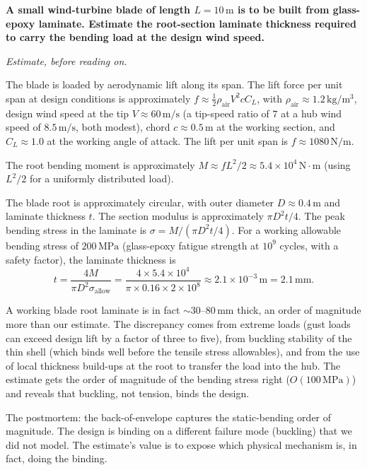 \begin{estimation}
\textbf{A small wind-turbine blade of length $L = 10\,\text{m}$ is to
be built from glass-epoxy laminate. Estimate the root-section laminate
thickness required to carry the bending load at the design wind
speed.}

\smallskip
\textit{Estimate, before reading on.}

\smallskip
The blade is loaded by aerodynamic lift along its span. The lift force
per unit span at design conditions is approximately
$f \approx \tfrac{1}{2} \rho_{\text{air}} V^2 c C_L$, with $\rho_{\text{air}}
\approx 1.2\,\text{kg}/\text{m}^3$, design wind speed at the tip
$V \approx 60\,\text{m}/\text{s}$ (a tip-speed ratio of $7$ at a hub
wind speed of $8.5\,\text{m}/\text{s}$, both modest), chord $c \approx
0.5\,\text{m}$ at the working section, and $C_L \approx 1.0$ at the
working angle of attack. The lift per unit span is
$f \approx 1080\,\text{N}/\text{m}$.

The root bending moment is approximately
$M \approx f L^2 / 2 \approx 5.4 \times 10^4\,\text{N}\cdot\text{m}$
(using $L^2/2$ for a uniformly distributed load).

The blade root is approximately circular, with outer diameter $D \approx
0.4\,\text{m}$ and laminate thickness $t$. The section modulus is
approximately $\pi D^2 t / 4$. The peak bending stress in the laminate
is $\sigma = M / (\pi D^2 t / 4)$. For a working allowable bending
stress of $200\,\text{MPa}$ (glass-epoxy fatigue strength at $10^9$
cycles, with a safety factor), the laminate thickness is
\[
t = \frac{4 M}{\pi D^2 \sigma_{\text{allow}}} =
\frac{4 \times 5.4 \times 10^4}{\pi \times 0.16 \times 2 \times 10^8}
\approx 2.1 \times 10^{-3}\,\text{m} = 2.1\,\text{mm}.
\]

A working blade root laminate is in fact $\sim 30$--$80\,\text{mm}$
thick, an order of magnitude more than our estimate. The discrepancy
comes from extreme loads (gust loads can exceed design lift by a factor
of three to five), from buckling stability of the thin shell (which
binds well before the tensile stress allowables), and from the use of
local thickness build-ups at the root to transfer the load into the
hub. The estimate gets the order of magnitude of the bending stress
right ($O(100\,\text{MPa})$) and reveals that buckling, not tension,
binds the design.

The postmortem: the back-of-envelope captures the static-bending order
of magnitude. The design is binding on a different failure mode
(buckling) that we did not model. The estimate's value is to expose
which physical mechanism is, in fact, doing the binding.
\end{estimation}

